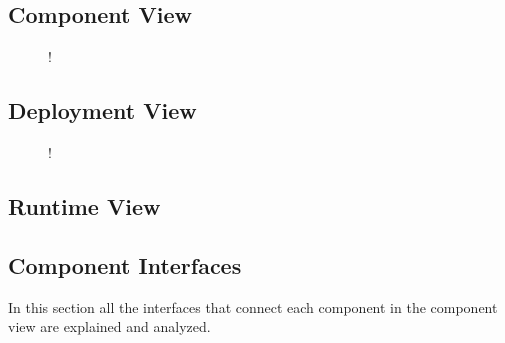 \subsection{Component View}
\label{sec:component-view}
\begin{figure}[H]
	\centering
	\resizebox{6in}
	{!}{}
\end{figure}
\subsection{Deployment View}
\begin{figure}[H]
	\centering
	\resizebox{6in}
	{!}{}
\end{figure}
\subsection{Runtime View}
\subsection{Component Interfaces}
In this section all the interfaces that connect each component in the component view are explained and analyzed.

